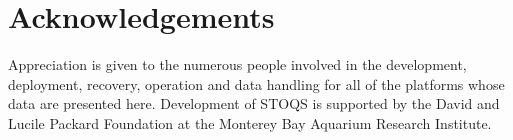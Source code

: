 \documentclass[conference]{IEEEtran}
\begin{document}


\section*{Acknowledgements}

Appreciation is given to the numerous people involved in the development, deployment, recovery, operation and data handling for all of the platforms whose data are presented here. Development of STOQS is supported by the David and Lucile Packard Foundation at the Monterey Bay Aquarium Research Institute.








%




\end{document}
